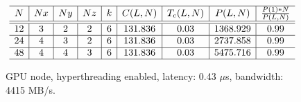 \documentclass{article}
\begin{document}
\begin{figure}
    $$
        \begin{array}{c | c | c | c | c | c | c | c | c} \hline
            N  & Nx & Ny & Nz & k & C(L,N)  & T_c(L,N) &     P(L,N)     & \frac{P(1)*N}{P(L,N)} \\ \hline
            \hline
            12 & 3  & 2  & 2  & 6 & 131.836 &   0.03   & 1368.929 &         0.99          \\ \hline
            24 & 4  & 3  & 2  & 6 & 131.836 &   0.03   & 2737.858 &         0.99          \\ \hline
            48 & 4  & 4  & 3  & 6 & 131.836 &   0.03   & 5475.716 &         0.99          \\ \hline
        \end{array}
    $$
    \caption{GPU node, hyperthreading enabled, latency: 0.43 $\mu$s, bandwidth: 4415 MB/s.}
\end{figure}
\end{document}
